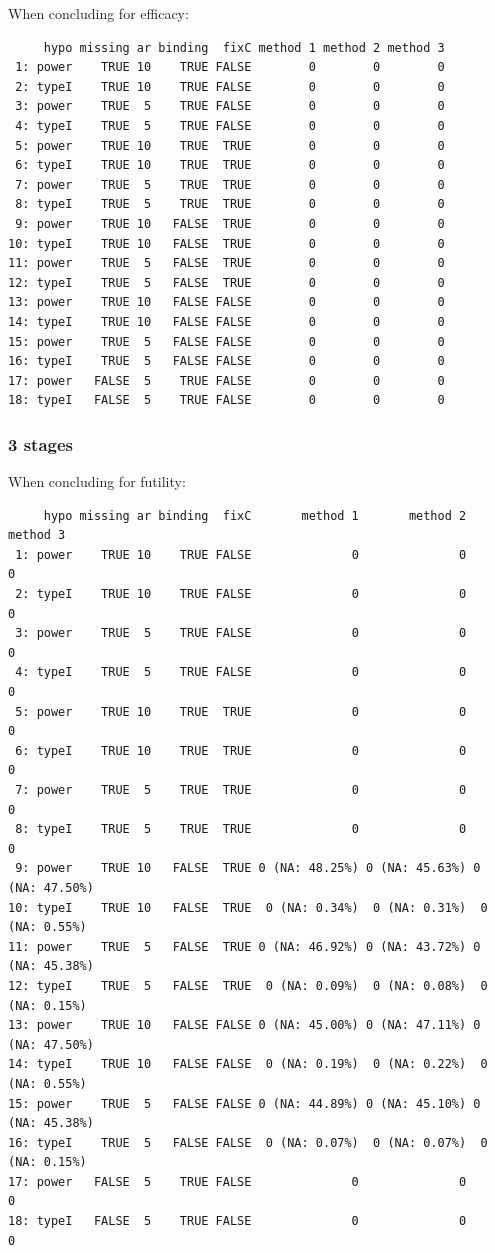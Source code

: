 \documentclass[12pt]{article}
\begin{document}
When concluding for efficacy:
\begin{verbatim}
     hypo missing ar binding  fixC method 1 method 2 method 3
 1: power    TRUE 10    TRUE FALSE        0        0        0
 2: typeI    TRUE 10    TRUE FALSE        0        0        0
 3: power    TRUE  5    TRUE FALSE        0        0        0
 4: typeI    TRUE  5    TRUE FALSE        0        0        0
 5: power    TRUE 10    TRUE  TRUE        0        0        0
 6: typeI    TRUE 10    TRUE  TRUE        0        0        0
 7: power    TRUE  5    TRUE  TRUE        0        0        0
 8: typeI    TRUE  5    TRUE  TRUE        0        0        0
 9: power    TRUE 10   FALSE  TRUE        0        0        0
10: typeI    TRUE 10   FALSE  TRUE        0        0        0
11: power    TRUE  5   FALSE  TRUE        0        0        0
12: typeI    TRUE  5   FALSE  TRUE        0        0        0
13: power    TRUE 10   FALSE FALSE        0        0        0
14: typeI    TRUE 10   FALSE FALSE        0        0        0
15: power    TRUE  5   FALSE FALSE        0        0        0
16: typeI    TRUE  5   FALSE FALSE        0        0        0
17: power   FALSE  5    TRUE FALSE        0        0        0
18: typeI   FALSE  5    TRUE FALSE        0        0        0
\end{verbatim}

\subsubsection{3 stages}
\label{sec:org5e4fe88}

When concluding for futility:
\begin{verbatim}
     hypo missing ar binding  fixC       method 1       method 2       method 3
 1: power    TRUE 10    TRUE FALSE              0              0              0
 2: typeI    TRUE 10    TRUE FALSE              0              0              0
 3: power    TRUE  5    TRUE FALSE              0              0              0
 4: typeI    TRUE  5    TRUE FALSE              0              0              0
 5: power    TRUE 10    TRUE  TRUE              0              0              0
 6: typeI    TRUE 10    TRUE  TRUE              0              0              0
 7: power    TRUE  5    TRUE  TRUE              0              0              0
 8: typeI    TRUE  5    TRUE  TRUE              0              0              0
 9: power    TRUE 10   FALSE  TRUE 0 (NA: 48.25%) 0 (NA: 45.63%) 0 (NA: 47.50%)
10: typeI    TRUE 10   FALSE  TRUE  0 (NA: 0.34%)  0 (NA: 0.31%)  0 (NA: 0.55%)
11: power    TRUE  5   FALSE  TRUE 0 (NA: 46.92%) 0 (NA: 43.72%) 0 (NA: 45.38%)
12: typeI    TRUE  5   FALSE  TRUE  0 (NA: 0.09%)  0 (NA: 0.08%)  0 (NA: 0.15%)
13: power    TRUE 10   FALSE FALSE 0 (NA: 45.00%) 0 (NA: 47.11%) 0 (NA: 47.50%)
14: typeI    TRUE 10   FALSE FALSE  0 (NA: 0.19%)  0 (NA: 0.22%)  0 (NA: 0.55%)
15: power    TRUE  5   FALSE FALSE 0 (NA: 44.89%) 0 (NA: 45.10%) 0 (NA: 45.38%)
16: typeI    TRUE  5   FALSE FALSE  0 (NA: 0.07%)  0 (NA: 0.07%)  0 (NA: 0.15%)
17: power   FALSE  5    TRUE FALSE              0              0              0
18: typeI   FALSE  5    TRUE FALSE              0              0              0
\end{verbatim}
\end{document}

